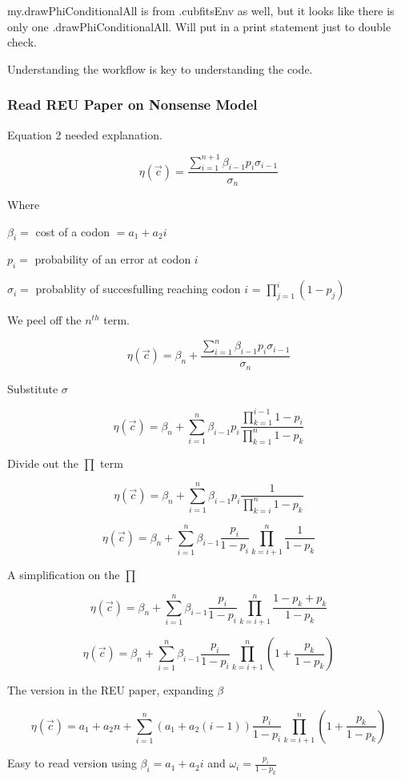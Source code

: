 \documentclass[11pt]{article} %
\begin{document}
my.drawPhiConditionalAll is from .cubfitsEnv as well, but it looks like there is only one .drawPhiConditionalAll. Will put in a print statement just to double check.

Understanding the workflow is key to understanding the code.


\subsubsection{Read REU Paper on Nonsense Model}
Equation 2 needed explanation.

$$\eta(\vec{c}) =
\frac{\sum_{i=1}^{n+1}\beta_{i-1} p_i \sigma_{i-1}}
{\sigma_n}$$

\noindent Where

$\beta_i = $ cost of a codon $ = a_1 + a_2i$

$p_i = $ probability of an error at codon $i$

$\sigma_i = $ probablity of succesfulling reaching codon $i$ = $\prod_{j=1}^{i}(1-p_j)$

We peel off the $n^{th}$ term.

$$\eta(\vec{c}) =
\beta_n + 
\frac{\sum_{i=1}^{n}
\beta_{i-1}
p_i
\sigma_{i-1}}
{\sigma_n}
$$



Substitute $\sigma$

$$\eta(\vec{c}) =
\beta_{n} +
\sum_{i=1}^{n}
\beta_{i-1}
p_i
\frac{\prod_{k=1}^{i-1}1-p_i}
{\prod_{k=1}^{n}1-p_k}
$$


Divide out the $\prod$ term

$$\eta(\vec{c}) =
\beta_{n} +
\sum_{i=1}^{n}
\beta_{i-1}
p_i
\frac{1}
{\prod_{k=i}^{n}1-p_k}
$$



$$\eta(\vec{c}) =
\beta_{n} +
\sum_{i=1}^{n}
\beta_{i-1}
\frac{p_i}{1-p_i}
\prod_{k=i+1}^{n}\frac{1}
{1-p_k}
$$

A simplification on the $\prod$

$$\eta(\vec{c}) =
\beta_{n} +
\sum_{i=1}^{n}
\beta_{i-1}
\frac{p_i}{1-p_i}
\prod_{k=i+1}^{n}\frac{1-p_k + p_k}
{1-p_k}
$$


$$\eta(\vec{c}) =
\beta_{n} +
\sum_{i=1}^{n}
\beta_{i-1}
\frac{p_i}{1-p_i}
\prod_{k=i+1}^{n}(1 + \frac{p_k}
{1-p_k})
$$

The version in the REU paper, expanding $\beta$

$$\eta(\vec{c}) =
a_1 + a_2n + 
\sum_{i=1}^{n}
(a_1 + a_2(i-1))
\frac{p_i}{1-p_i}
\prod_{k=i+1}^{n}(1 + \frac{p_k}
{1-p_k})
$$

Easy to read version using $\beta_i = a_1 + a_2i$ and $\omega_i = \frac{p_i}{1-p_k}$
\end{document}
